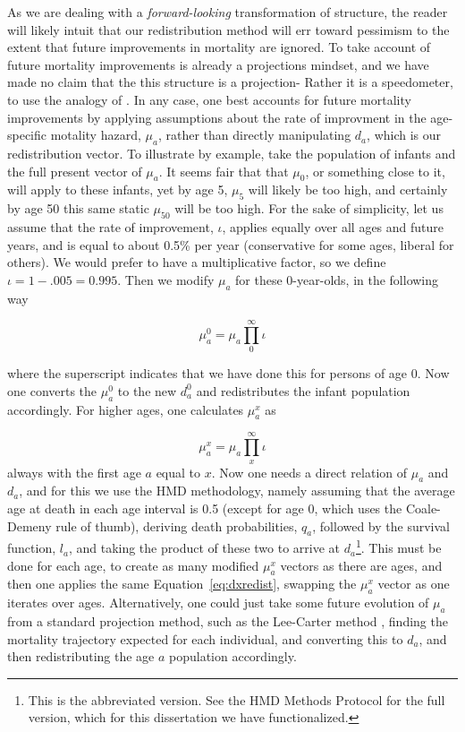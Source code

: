 \FloatBarrier

As we are dealing with a \textit{forward-looking}\citep{sanderson2007new}
transformation of structure, the reader will likely intuit that our redistribution 
method will err toward pessimism to the extent that
future improvements in mortality are ignored. To take account of future
mortality improvements is already a projections mindset, and we have made no
claim that the this structure is a projection- Rather it is a speedometer, to
use the analogy of \citet{coale1972growth}. In any case, one best accounts for
future mortality improvements by applying assumptions about the rate of
improvment in the age-specific motality hazard, $\mu_a$, rather than directly
manipulating $d_a$, which is our redistribution vector. To illustrate by
example, take the population of infants and the full present vector of $\mu_a$. It seems fair that
that $\mu_0$, or something close to it, will apply to these infants, yet by age
5, $\mu_5$ will likely be too high, and certainly by age 50
this same static $\mu_50$ will be too high. For the sake of simplicity, let us assume that the
rate of improvement, $\iota$, applies equally over all ages and future years,
and is equal to about 0.5\% per year (conservative for some ages, liberal
for others). We would prefer to have a multiplicative factor, so we define
$\iota = 1-.005 = 0.995$. Then we modify $\mu_a$ for these 0-year-olds, in
the following way

\begin{equation}
\mu_a^0 = \mu_a \prod _0 ^\infty \iota 
\end{equation}

where the superscript indicates that we have done this for persons of age 0. Now
one converts the $\mu _a^0$ to the new $d_a^0$ and redistributes the infant
population accordingly. For higher ages, one calculates $\mu_a^x$ as

\begin{equation}
\mu_a^x = \mu_a \prod _x ^\infty \iota 
\end{equation}
always with the first age $a$ equal to $x$.
Now one needs a direct relation of $\mu _a$ and $d_a$, and for this we use the
HMD methodology, namely assuming that the average age at death in each age
interval is 0.5 (except for age 0, which uses the Coale-Demeny rule of thumb),
deriving death probabilities, $q_a$, followed by the survival function, $l_a$,
and taking the product of these two to arrive at $d_a$\footnote{This is the
abbreviated version. See the HMD Methods Protocol for the full version, which
for this dissertation we have functionalized.}. This must be done for each age,
to create as many modified $\mu _a^x $ vectors as there are ages, and then one applies the same
Equation~\ref{eq:dxredist}, swapping the $\mu _a^x$ vector as one iterates over
ages. Alternatively, one could just take some future evolution of $\mu_a$ from a
standard projection method, such as the Lee-Carter method
\citep{lee1992modeling}, finding the mortality trajectory expected for each individual, and converting
this to $d_a$, and then redistributing the age $a$ population accordingly. 

